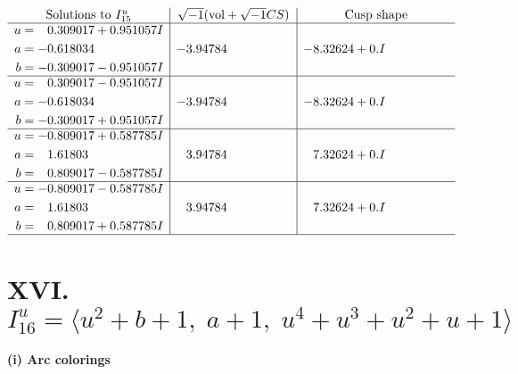 \documentclass[1p]{elsarticle_modified}
\theoremstyle{definition}
\newcommand{\I}{\sqrt{-1}}
\begin{document}
$$\begin{array}{c|c|c}  
\text{Solutions to }I^u_{15}& \I (\text{vol} + \sqrt{-1}CS) & \text{Cusp shape}\\
 \hline 
\begin{aligned}
u &= \phantom{-}0.309017 + 0.951057 I \\
a &= -0.618034\phantom{ +0.000000I} \\
b &= -0.309017 - 0.951057 I\end{aligned}
 & -3.94784\phantom{ +0.000000I} & -8.32624 + 0. I\phantom{ +0.000000I} \\ \hline\begin{aligned}
u &= \phantom{-}0.309017 - 0.951057 I \\
a &= -0.618034\phantom{ +0.000000I} \\
b &= -0.309017 + 0.951057 I\end{aligned}
 & -3.94784\phantom{ +0.000000I} & -8.32624 + 0. I\phantom{ +0.000000I} \\ \hline\begin{aligned}
u &= -0.809017 + 0.587785 I \\
a &= \phantom{-}1.61803\phantom{ +0.000000I} \\
b &= \phantom{-}0.809017 - 0.587785 I\end{aligned}
 & \phantom{-}3.94784\phantom{ +0.000000I} & \phantom{-}7.32624 + 0. I\phantom{ +0.000000I} \\ \hline\begin{aligned}
u &= -0.809017 - 0.587785 I \\
a &= \phantom{-}1.61803\phantom{ +0.000000I} \\
b &= \phantom{-}0.809017 + 0.587785 I\end{aligned}
 & \phantom{-}3.94784\phantom{ +0.000000I} & \phantom{-}7.32624 + 0. I\phantom{ +0.000000I}\\
 \hline 
 \end{array}$$\newpage\newpage\renewcommand{\arraystretch}{1}
\centering \section*{XVI. $I^u_{16}= \langle u^2+b+1,\;a+1,\;u^4+u^3+u^2+u+1 \rangle$}
\flushleft \textbf{(i) Arc colorings}\\
\end{document}
